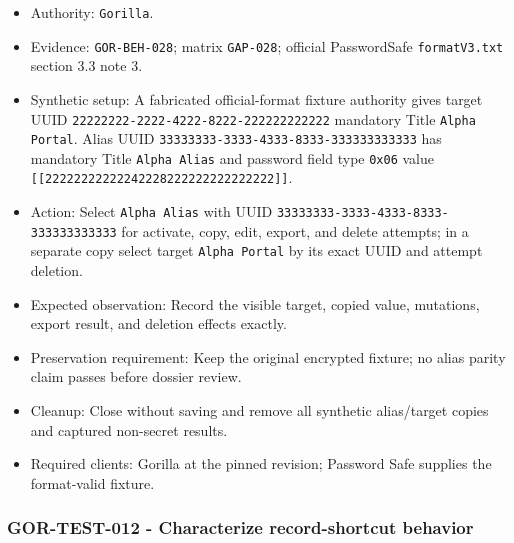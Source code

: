\documentclass[
  letterpaper,
]{article}
\newcommand{\passthrough}[1]{#1}
\providecommand{\tightlist}{%
  \setlength{\itemsep}{0pt}\setlength{\parskip}{0pt}}
\begin{document}
\begin{itemize}
\tightlist
\item
  Authority: \passthrough{\lstinline!Gorilla!}.
\item
  Evidence: \nolinkurl{GOR-BEH-028}; matrix \passthrough{\lstinline!GAP-028!}; official PasswordSafe
  \nolinkurl{formatV3.txt} section 3.3 note 3.
\item
  Synthetic setup: A fabricated official-format fixture authority gives target UUID
  \nolinkurl{22222222-2222-4222-8222-222222222222} mandatory Title \passthrough{\lstinline!Alpha Portal!}. Alias UUID
  \nolinkurl{33333333-3333-4333-8333-333333333333} has mandatory Title \passthrough{\lstinline!Alpha Alias!} and
  password field type \passthrough{\lstinline!0x06!} value \nolinkurl{[[22222222222242228222222222222222]]}.
\item
  Action: Select \passthrough{\lstinline!Alpha Alias!} with UUID \nolinkurl{33333333-3333-4333-8333-333333333333} for
  activate, copy, edit, export, and delete attempts; in a separate copy select target
  \passthrough{\lstinline!Alpha Portal!} by its exact UUID and attempt deletion.
\item
  Expected observation: Record the visible target, copied value, mutations, export result, and deletion effects exactly.
\item
  Preservation requirement: Keep the original encrypted fixture; no alias parity claim passes before dossier review.
\item
  Cleanup: Close without saving and remove all synthetic alias/target copies and captured non-secret results.
\item
  Required clients: Gorilla at the pinned revision; Password Safe supplies the format-valid fixture.
\end{itemize}

\subsubsection{GOR-TEST-012 - Characterize record-shortcut
behavior}\label{gor-test-012---characterize-record-shortcut-behavior}
\end{document}

